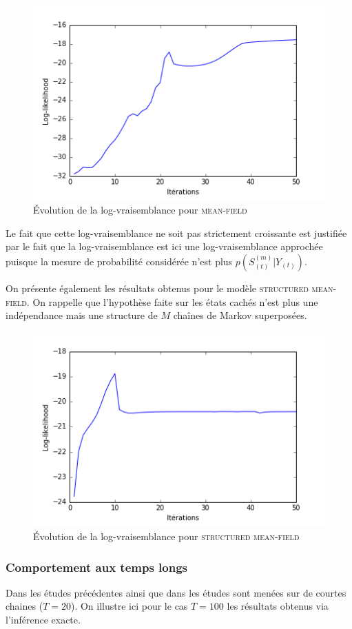 \documentclass[10pt,a4paper]{article}
\newcommand{\meanfield}{\textsc{mean-field}}
\newcommand{\structmeanfield}{\textsc{structured mean-field}}
\begin{document}
\begin{figure}[H]
\centering
\includegraphics[scale=0.5]{../resources/pictures/M3_K2_meanfield.png}
\caption{Évolution de la log-vraisemblance pour \meanfield}
\end{figure}

Le fait que cette log-vraisemblance ne soit pas strictement croissante est 
justifiée par le fait que la log-vraisemblance est ici une log-vraisemblance 
approchée puisque la mesure de probabilité considérée n'est plus 
$p(S_{(t)}^{(m)} \vert Y_{(t)})$.

On présente également les résultats obtenus pour le modèle \structmeanfield. On rappelle
que l'hypothèse faite sur les états cachés n'est plus une indépendance mais une structure
 de $M$ chaînes de Markov superposées. 
 
 \begin{figure}[H]
\centering
\includegraphics[scale=0.5]{../resources/pictures/M3_K2_structmeanfield.png}
\caption{Évolution de la log-vraisemblance pour \structmeanfield}
\end{figure}
\subsubsection{Comportement aux temps longs}
 Dans les études précédentes ainsi que dans \cite{ghahramani1997factorial} les études sont menées sur de
  courtes chaines ($T=20$). On illustre ici pour le cas $T = 100$ les résultats obtenus via l'inférence 
  exacte.
  
\end{document}
